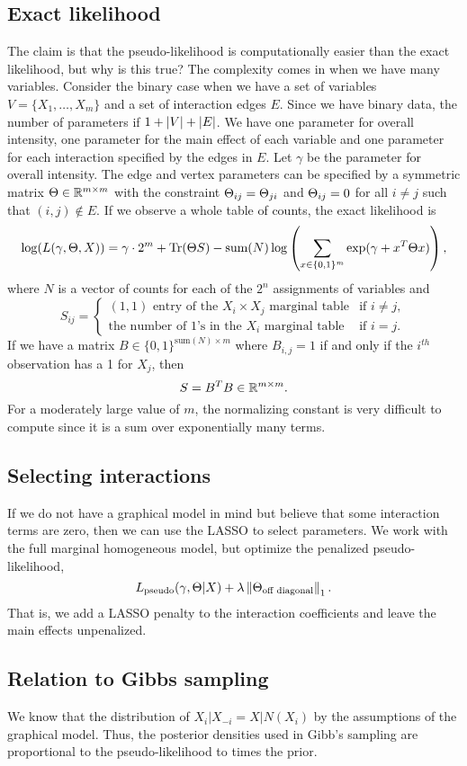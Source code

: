 \subsection{Exact likelihood}
The claim is that the pseudo-likelihood is computationally easier than the exact likelihood, but why is this true? The complexity comes in when we have many variables.  Consider the binary case when we have a set of variables $V = \{X_1,\ldots,X_m\}$ and a set of interaction edges $E$. Since we have binary data, the number of parameters if $1 + {\left\lvert V\right\rvert}+{\left\lvert E\right\rvert}$. We have one parameter for overall intensity, one parameter for the main effect of each variable and one parameter for each interaction specified by the edges in $E$. Let $\gamma$ be the parameter for overall intensity. The edge and vertex parameters can be specified by a symmetric matrix ${\Theta} \in \mathbb{R}^{m \times m}$ with the constraint ${\Theta}_{ij} = {\Theta}_{ji}$ and ${\Theta}_{ij}=0$ for all $i\neq j$ such that $(i,j) \notin E$. If we observe a whole table of counts, the exact likelihood is 
\[\log(L(\gamma,{\Theta},X)) = \gamma \cdot 2^m +\operatorname{Tr}({\Theta} S)-\text{sum}(N)\log \left(\sum_{x \in \{0,1\}^m}\exp(\gamma + x^T{\Theta} x)\right),\]
where $N$ is a vector of counts for each of the $2^n$ assignments of variables and 
\[S_{ij} = \begin{cases}
    (1,1) \text{ entry of the $X_i \times X_j$ marginal table} & \text{if } i \neq j,\\
    \text{the number of 1's in the $X_i$ marginal table} & \text{if } i=j.
\end{cases} \]
If we have a matrix $B \in \{0,1\}^{\text{sum}(N)\times m}$ where $B_{i,j}=1$ if and only if the $i^{th}$ observation has a 1 for $X_j$, then 
\[S = B^TB \in {\mathbb R}^{m \times m}. \]
For a moderately large value of $m$, the normalizing constant is very difficult to compute since it is a sum over exponentially many terms. 
\subsection{Selecting interactions}
If we do not have a graphical model in mind but believe that some interaction terms are zero, then we can use the LASSO to select parameters. We work with the full marginal homogeneous model, but optimize the penalized pseudo-likelihood,
\[L_{\text{pseudo}}(\gamma,{\Theta}|X) + \lambda \left\|{\Theta}_{\text{off diagonal}}\right\|_1. \]
That is, we add a LASSO penalty to the interaction coefficients and leave the main effects unpenalized. 
\subsection{Relation to Gibbs sampling}
We know that the distribution of $X_i|X_{-i}=X|N(X_i)$ by the assumptions of the graphical model. Thus, the posterior densities used in Gibb's sampling are proportional to the pseudo-likelihood to times the prior.
